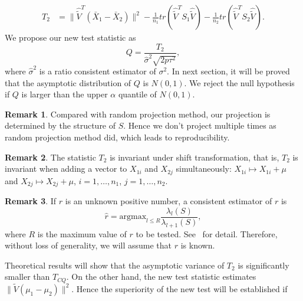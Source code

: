 \documentclass[review]{elsarticle}
\theoremstyle{plain}
\theoremstyle{definition}
\newtheorem{remark}{\quad\quad Remark}
\theoremstyle{remark}
\begin{document}
\begin{equation*}
\begin{aligned}
    T_2&=\|\hat{\tilde{V}}^T(\bar{X}_1-\bar{X}_2)\|^2-\frac{1}{n_1}tr(\hat{\tilde{V}}^T S_1\hat{\tilde{V}})-\frac{1}{n_2}tr(\hat{\tilde{V}}^T S_2\hat{\tilde{V}}).
\end{aligned}
\end{equation*}
We propose our new test statistic as
\begin{equation}\label{myTest}
    Q=\frac{T_2}{\hat{\sigma}^2\sqrt{2p\tau^2}},
\end{equation}
where $\hat{\sigma}^2$ is a ratio consistent estimator of $\sigma^2$. In next section, it will be proved that the asymptotic distribution of $Q$ is $N(0,1)$. We reject the null hypothesis if $Q$ is larger than the upper $\alpha$ quantile of $N(0,1)$.

\begin{remark}
    Compared with random projection method, our projection is determined by the structure of $S$. Hence we don't  project multiple times as random projection method did, which leads to reproducibility.
\end{remark}


\begin{remark} The statistic $T_2$ is invariant under shift transformation, that is, $T_2$ is invariant when adding a vector to $X_{1i}$ and $X_{2j}$ simultaneously: $X_{1i}\mapsto X_{1i}+\mu$ and $X_{2j}\mapsto X_{2j}+\mu$, $i=1,\ldots,n_1$, $j=1,\ldots,n_2$.
\end{remark}


\begin{remark}
If $r$ is an unknown positive number, a consistent estimator of $r$ is
\begin{equation}\label{estimateR}
    \hat{r}=\textrm{argmax}_{l\leq R}\frac{\lambda_l(S)}{\lambda_{l+1}(S)},
\end{equation}
where $R$ is the maximum value of $r$ to be tested. See~\cite{Ahn2009Eigenvalue} for detail. Therefore, without loss of generality, we will assume that $r$ is known.
\end{remark}

    Theoretical results will show that the asymptotic variance of $T_2$ is significantly smaller than $T_{CQ}$. 
    On the other hand, the new test statistic estimates $\|\tilde{V}(\mu_1-\mu_2)\|^2$. Hence the superiority of the new test will be established if 
    
\end{document}
